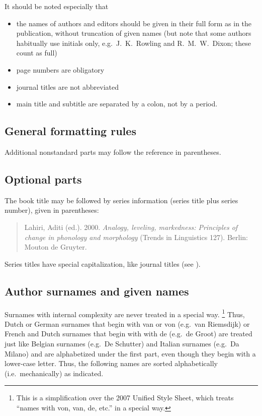 \documentclass[a4paper]{article}
\newenvironment{gsrexq}{\begin{quote}\color{blue}}{\end{quote}}
\newcommand{\gsrex}[1]{{\color{blue}#1}}
\begin{document}
It should be noted especially that

\begin{itemize}
\item  the names of authors and editors should be given in their full form as in the publication, without truncation of given names (but note that some authors habitually use initials only, e.g.~\gsrex{J.~K.~Rowling} and \gsrex{R.~M.~W.~Dixon}; these count as full)
\item page numbers are obligatory
\item journal titles are not abbreviated
\item main title and subtitle are separated by a colon, not by a period.
\end{itemize}

\subsection{General formatting rules}\label{sec:general-formatting-rules}

Additional nonstandard parts may follow the reference in parentheses.

\subsection{Optional parts}\label{sec:optional-parts}

The book title may be followed by series information (series title plus
series number), given in parentheses: 
\begin{gsrexq}
Lahiri, Aditi (ed.). 2000. \textit{Analogy, leveling, markedness: Principles of change in phonology and morphology} (Trends in Linguistics 127). Berlin: Mouton de Gruyter.
\end{gsrexq}

Series titles have special capitalization, like journal titles (see ). 

\subsection{Author surnames and given names}\label{sec:author-surnames-and-given-names}

Surnames with internal complexity are never treated in a special way.
\footnote{This 
  is a simplification over the 2007 Unified Style Sheet, which treats ``names with von, van, de, etc.'' in a special way.
}
Thus, Dutch or German surnames that begin with van or von (e.g.~van
Riemsdijk) or French and Dutch surnames that begin with with de (e.g.~de
Groot) are treated just like Belgian surnames (e.g.~De Schutter) and
Italian surnames (e.g.~Da Milano) and are alphabetized under the first
part, even though they begin with a lower-case letter. Thus, the
following names are sorted alphabetically (i.e.~mechanically) as
indicated. 
\end{document}
